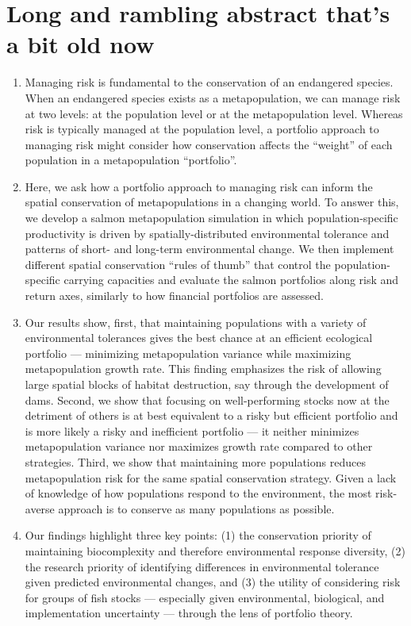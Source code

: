 \section{Long and rambling abstract that's a bit old now}

\begin{enumerate}
\def\labelenumi{\arabic{enumi}.}
\item
  Managing risk is fundamental to the conservation of an endangered
  species. When an endangered species exists as a metapopulation, we can
  manage risk at two levels: at the population level or at the
  metapopulation level. Whereas risk is typically managed at the
  population level, a portfolio approach to managing risk might consider
  how conservation affects the ``weight'' of each population in a
  metapopulation ``portfolio''.
\item
  Here, we ask how a portfolio approach to managing risk can inform the
  spatial conservation of metapopulations in a changing world. To answer
  this, we develop a salmon metapopulation simulation in which
  population-specific productivity is driven by spatially-distributed
  environmental tolerance and patterns of short- and long-term
  environmental change. We then implement different spatial conservation
  ``rules of thumb'' that control the population-specific carrying
  capacities and evaluate the salmon portfolios along risk and return
  axes, similarly to how financial portfolios are assessed.
\item
  Our results show, first, that maintaining populations with a variety
  of environmental tolerances gives the best chance at an efficient
  ecological portfolio --- minimizing metapopulation variance while
  maximizing metapopulation growth rate. This finding emphasizes the
  risk of allowing large spatial blocks of habitat destruction, say
  through the development of dams. Second, we show that focusing on
  well-performing stocks now at the detriment of others is at best
  equivalent to a risky but efficient portfolio and is more likely a
  risky and inefficient portfolio --- it neither minimizes
  metapopulation variance nor maximizes growth rate compared to other
  strategies. Third, we show that maintaining more populations reduces
  metapopulation risk for the same spatial conservation strategy. Given
  a lack of knowledge of how populations respond to the environment, the
  most risk-averse approach is to conserve as many populations as
  possible.
\item
  Our findings highlight three key points: (1) the conservation priority
  of maintaining biocomplexity and therefore environmental response
  diversity, (2) the research priority of identifying differences in
  environmental tolerance given predicted environmental changes, and (3)
  the utility of considering risk for groups of fish stocks ---
  especially given environmental, biological, and implementation
  uncertainty --- through the lens of portfolio theory.
\end{enumerate}

